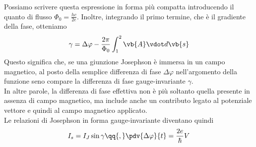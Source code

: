 Possiamo scrivere questa espressione in forma più compatta introducendo il quanto di flusso $\Phi_0=\frac{hc}{2e}$. Inoltre, integrando il primo termine, che è il gradiente della fase, otteniamo
\begin{equation*}
    \gamma
    =
    \Delta\varphi
    -
    \frac{2\pi}{\Phi_0}
    \int_{1}^{2}
    \vb{A}\vdot d\vb{s}
\end{equation*}
Questo significa che, se una giunzione Josephson è immersa in un campo magnetico, al posto della semplice differenza di fase $\Delta\varphi$ nell'argomento della funzione seno compare la differenza di fase gauge-invariante $\gamma$.\\
In altre parole, la differenza di fase effettiva non è più soltanto quella presente in assenza di campo magnetico, ma include anche un contributo legato al potenziale vettore e quindi al campo magnetico applicato.\\
Le relazioni di Josephson in forma gauge-invariante diventano quindi
\begin{equation*}
    I_s
    =I_J \sin{\gamma}
    \qq{,}
    \pdv{\Delta\varphi}{t}
    =\frac{2e}{\hbar}V
\end{equation*}
